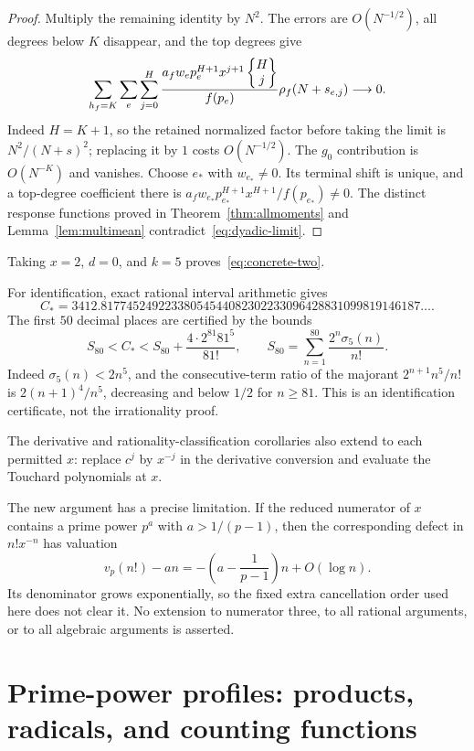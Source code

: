 \begin{proof}
Multiply the remaining identity by $N^2$. The errors are
$O(N^{-1/2})$, all degrees below $K$ disappear, and the top degrees
give
\begin{equation}\label{eq:dyadic-limit}
 \sum_{h_f=K}\sum_e\sum_{j=0}^H
 \frac{a_fw_ep_e^{H+1}x^{j+1}\left\{\begin{matrix}H\\j\end{matrix}\right\}}{f(p_e)}
      \rho_f(N+s_{e,j})\longrightarrow0.
\end{equation}
Indeed $H=K+1$, so the retained normalized factor before taking
the limit is $N^2/(N+s)^2$; replacing it by $1$ costs
$O(N^{-1/2})$. The $g_0$ contribution is $O(N^{-K})$ and vanishes.
Choose $e_*$ with $w_{e_*}\ne0$. Its terminal shift is unique,
and a top-degree coefficient there is
$a_fw_{e_*}p_{e_*}^{H+1}x^{H+1}/f(p_{e_*})\ne0$.
The distinct response functions proved in
Theorem~\ref{thm:allmoments} and Lemma~\ref{lem:multimean}
contradict~\eqref{eq:dyadic-limit}.
\end{proof}

Taking $x=2$, $d=0$, and $k=5$ proves~\eqref{eq:concrete-two}.

For identification, exact rational interval arithmetic gives
\[
 C_*=3412.81774524922338054544082302233096428831099819146187\ldots.
\]
The first $50$ decimal places are certified by the bounds
\[
 S_{80}<C_*<S_{80}+\frac{4\cdot2^{81}81^5}{81!},
 \qquad S_{80}=\sum_{n=1}^{80}\frac{2^n\sigma_5(n)}{n!}.
\]
Indeed $\sigma_5(n)<2n^5$, and the consecutive-term ratio of the
majorant $2^{n+1}n^5/n!$ is $2(n+1)^4/n^5$, decreasing and below
$1/2$ for $n\geq81$. This is an identification certificate, not the
irrationality proof.

The derivative and rationality-classification corollaries also extend
to each permitted $x$: replace $c^j$ by $x^{-j}$ in the derivative
conversion and evaluate the Touchard polynomials at $x$.

The new argument has a precise limitation. If the reduced numerator
of $x$ contains a prime power $p^a$ with $a>1/(p-1)$, then the
corresponding defect in $n!x^{-n}$ has valuation
\[
 v_p(n!)-an=-\left(a-\frac1{p-1}\right)n+O(\log n).
\]
Its denominator grows exponentially, so the fixed extra cancellation
order used here does not clear it. No extension to numerator three,
to all rational arguments, or to all algebraic arguments is asserted.


\section{Prime-power profiles: products, radicals, and counting functions}
\label{sec:profiles}

